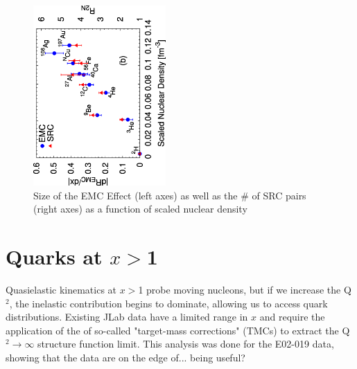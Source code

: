 \begin{figure}[htb]
  \includegraphics[angle=270, width=0.45\textwidth]{plots/emc_src_vs_scaled_dens_all.eps}
  \caption{Size of the EMC Effect (left axes) as well as the \# of SRC pairs (right axes) as a function of scaled nuclear density}
  \label{fig:src_emc}
\end{figure}
\section{Quarks at $x>$1}
Quasielastic kinematics at $x>$1 probe moving nucleons, but if we increase the Q$^2$, the inelastic contribution begins to dominate, allowing us to access quark distributions. Existing JLab data have a limited range in $x$ and require the application of the of so-called "target-mass corrections" (TMCs) to extract the Q$^2\rightarrow\infty$ structure function limit.  This analysis was done for the E02-019 data, showing that the data are on the edge of... being useful?


